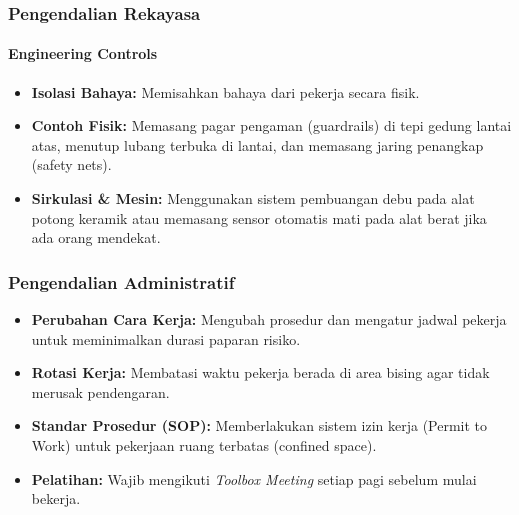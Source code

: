 \documentclass[../main.tex]{subfiles}
\begin{document}
\begin{frame}[mytitle=standard, t, mycolor=digiPH_gray]
	\frametitle{Pengendalian Rekayasa}
	\framesubtitle{Engineering Controls}

	\begin{itemize}
		\item \textbf{Isolasi Bahaya:} Memisahkan bahaya dari pekerja secara fisik.
		\item \textbf{Contoh Fisik:} Memasang pagar pengaman (guardrails) di tepi gedung lantai atas, menutup lubang terbuka di lantai, dan memasang jaring penangkap (safety nets).
		\item \textbf{Sirkulasi \& Mesin:} Menggunakan sistem pembuangan debu pada alat potong keramik atau memasang sensor otomatis mati pada alat berat jika ada orang mendekat.
	\end{itemize}

	\vfill
\end{frame}

\begin{frame}[mytitle=standard, c]
	\frametitle{Pengendalian Administratif}

	\begin{itemize}
		\item \textbf{Perubahan Cara Kerja:} Mengubah prosedur dan mengatur jadwal pekerja untuk meminimalkan durasi paparan risiko.
		\item \textbf{Rotasi Kerja:} Membatasi waktu pekerja berada di area bising agar tidak merusak pendengaran.
		\item \textbf{Standar Prosedur (SOP):} Memberlakukan sistem izin kerja (Permit to Work) untuk pekerjaan ruang terbatas (confined space).
		\item \textbf{Pelatihan:} Wajib mengikuti \textit{Toolbox Meeting} setiap pagi sebelum mulai bekerja.
	\end{itemize}

	\vfill
\end{frame}
\end{document}
